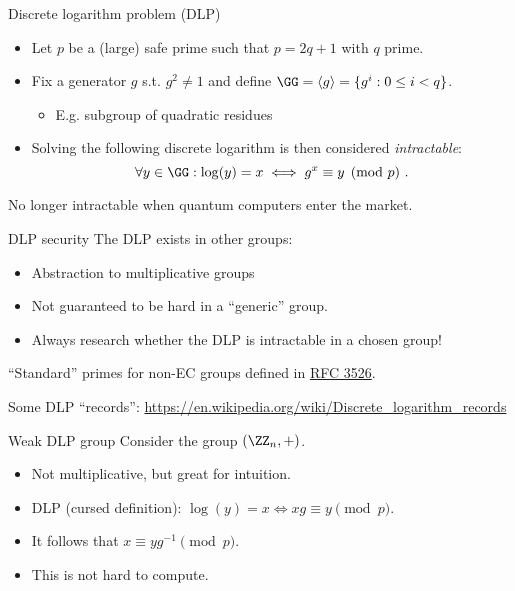 \begin{frame}{Discrete logarithm problem (DLP)}
  \begin{itemize}[<+(1)->]
    \item Let $p$ be a (large) safe prime such that $p = 2q + 1$ with $q$ prime.
    \item Fix a generator $g$ s.t. $g^2 \neq 1$ and define $\GG = \langle g \rangle = \{g^i :0 \le i < q\}$.
    \begin{itemize}
      \item E.g. subgroup of quadratic residues
    \end{itemize}
    \item Solving the following discrete logarithm is then considered \emph{intractable}:
    \[
      \forall y\in\GG: \log(y) = x \iff g^x \equiv y \pmod{p}\ .
    \]
  \end{itemize}

  \pause
  No longer intractable when quantum computers enter the market.
\end{frame}

\begin{frame}{DLP security}
  The DLP exists in other groups:
  \begin{itemize}[<+(1)->]
    \item Abstraction to multiplicative groups
    \item Not guaranteed to be hard in a \enquote{generic} group.
    \item Always research whether the DLP is intractable in a chosen group!
  \end{itemize}

  \pause
  \enquote{Standard} primes for non-EC groups defined in \href{https://datatracker.ietf.org/doc/html/rfc3526}{RFC 3526}.

  \pause
  Some DLP \enquote{records}: \url{https://en.wikipedia.org/wiki/Discrete_logarithm_records}
\end{frame}

\begin{frame}{Weak DLP group}
  Consider the group $(\ZZ_n, +)$.
  \begin{itemize}[<+(1)->]
    \item Not multiplicative, but great for intuition.
    \item DLP (cursed definition): $\log(y) = x \iff xg \equiv y \pmod{p}$.
    \item It follows that $x \equiv yg^{-1} \pmod{p}$.
    \item This is not hard to compute.
  \end{itemize}
\end{frame}

